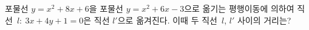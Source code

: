 포물선 $y=x^2+8x+6$을 포물선 $y=x^2+6x-3$으로 옮기는 평행이동에 의하여 직선~$l:\ 3x+4y+1=0$은 직선 $l'$으로 옮겨진다. 이때 두 직선~$l$, $l'$ 사이의 거리는?
